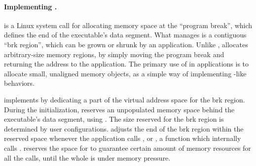 \paragraph{Implementing .}

 is a Linux system call for 
allocating memory space at the ``program break'', which defines the end of the executable's data segment.
What  manages is a contiguous ``brk region'', which can be grown or shrunk by an application.
Unlike ,  allocates arbitrary-size memory regions, by simply moving the program break
and returning the address to the application.
The primary use of  in applications is %
to allocate small, unaligned memory objects,
as a simple way of implementing -like behaviors.





\thelibos{} implements  by dedicating a part of the virtual address space for the brk region.
During the initialization, \thelibos{} reserves an unpopulated memory space
behind the executable's data segment, using .
The size reserved for the brk region is determined
by user configurations.
\thelibos{} adjusts the end of the brk region
within the reserved space
whenever the application calls , or , a \libc{} function which internally calls .
\thelibos{} reserves the space for 
to guarantee certain amount of memory resources for all the  calls,
until the whole \picoproc{} is under memory pressure.





